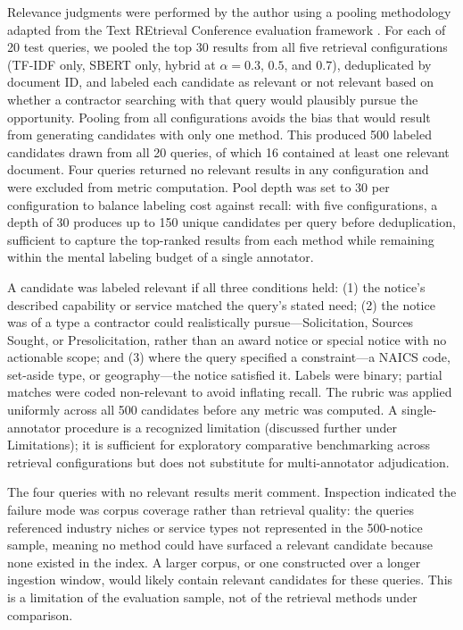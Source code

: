 \documentclass[10pt,twocolumn]{article}
\begin{document}
Relevance judgments were performed by the author using a pooling methodology adapted from the Text REtrieval Conference evaluation framework \cite{Manning2008}. For each of 20 test queries, we pooled the top 30 results from all five retrieval configurations (TF-IDF only, SBERT only, hybrid at $\alpha = 0.3$, $0.5$, and $0.7$), deduplicated by document ID, and labeled each candidate as relevant or not relevant based on whether a contractor searching with that query would plausibly pursue the opportunity. Pooling from all configurations avoids the bias that would result from generating candidates with only one method. This produced 500 labeled candidates drawn from all 20 queries, of which 16 contained at least one relevant document. Four queries returned no relevant results in any configuration and were excluded from metric computation. Pool depth was set to 30 per configuration to balance labeling cost against recall: with five configurations, a depth of 30 produces up to 150 unique candidates per query before deduplication, sufficient to capture the top-ranked results from each method while remaining within the mental labeling budget of a single annotator.

A candidate was labeled relevant if all three conditions held: (1) the notice's described capability or service matched the query's stated need; (2) the notice was of a type a contractor could realistically pursue---Solicitation, Sources Sought, or Presolicitation, rather than an award notice or special notice with no actionable scope; and (3) where the query specified a constraint---a NAICS code, set-aside type, or geography---the notice satisfied it. Labels were binary; partial matches were coded non-relevant to avoid inflating recall. The rubric was applied uniformly across all 500 candidates before any metric was computed. A single-annotator procedure is a recognized limitation (discussed further under Limitations); it is sufficient for exploratory comparative benchmarking across retrieval configurations but does not substitute for multi-annotator adjudication.

The four queries with no relevant results merit comment. Inspection indicated the failure mode was corpus coverage rather than retrieval quality: the queries referenced industry niches or service types not represented in the 500-notice sample, meaning no method could have surfaced a relevant candidate because none existed in the index. A larger corpus, or one constructed over a longer ingestion window, would likely contain relevant candidates for these queries. This is a limitation of the evaluation sample, not of the retrieval methods under comparison.
\end{document}
